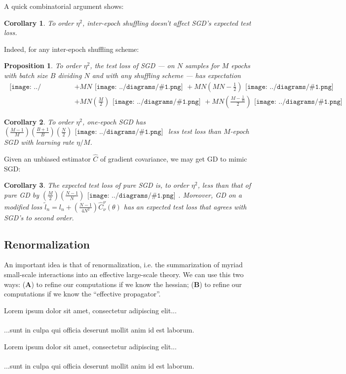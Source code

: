 \documentclass{article}
\newtheorem{cor}{Corollary}
\newtheorem{prop}{Proposition}
\newcommand{\wrap}[1]{\left( #1 \right)}
\newcommand{\dia} [1]{\begin{gathered}\texttt{[image: ../diagrams/\#1.png]}\end{gathered}}
\newcommand{\mdia}[1]{\begin{gathered}\texttt{[image: ../diagrams/\#1.png]}\end{gathered}}
\newcommand{\sdia}[1]{\begin{gathered}\texttt{[image: ../diagrams/\#1.png]}\end{gathered}}
\newcommand{\lorem}[1]{
    Lorem ipsum dolor sit amet, consectetur adipiscing elit...\\
    \nopagebreak\vspace{#1cm} \ \\
    ...sunt in culpa qui officia deserunt mollit anim id est laborum.
}
\begin{document}
    A quick combinatorial argument shows:
    \begin{cor}
        To order $\eta^2$, inter-epoch shuffling doesn't affect SGD's
        expected test loss.
    \end{cor}
    Indeed, for any inter-epoch shuffling scheme: 
    \begin{prop}
        To order $\eta^2$, the test loss of SGD --- on $N$
        samples for $M$ epochs with batch size $B$ dividing $N$ and with any
        shuffling scheme --- has expectation
        {\small
        \begin{align*}
                                                    \dia{(0)()}
            &+ MN                                   \dia{(0-1)(01)}
             + MN\wrap{MN - \frac{1}{2}}            \dia{(0-1-2)(01-12)} \\
            &+ MN\wrap{\frac{M}{2}}                 \dia{c(01-2)(02-12)}  
             + MN\wrap{\frac{M-\frac{1}{B}}{2}}     \dia{c(01-2)(01-12)}
        \end{align*}
        }
    \end{prop}

    \begin{cor}
        To order $\eta^2$, one-epoch SGD has 
        $
             \wrap{\frac{M-1}{M}}\wrap{\frac{B+1}{B}}\wrap{\frac{N}{2}} \mdia{c(01-2)(01-12)}
        $
        less test loss than $M$-epoch SGD with learning rate $\eta/M$. 
    \end{cor}

    Given an unbiased estimator $\hat{C}$ of gradient covariance, we may get
    GD to mimic SGD:
    \begin{cor}
        The expected test loss of pure SGD is, to order $\eta^2$,
        less than that of pure GD by
        $
              \wrap{\frac{M}{2}} \wrap{\frac{N-1}{N}} \sdia{c(01-2)(01-12)}
        $.
        Moreover, GD on a modified loss 
        $
            \tilde l_n = l_n + \wrap{\frac{N-1}{4N^2}} \hat{C}_\nu^\nu(\theta)
        $
        has an expected test loss that agrees with SGD's to second order.
    \end{cor}

\subsection{Renormalization}
    An important idea is that of renormalization, i.e. the summarization of  
    myriad small-scale interactions into an effective large-scale theory. 
    We can use this two ways:
        ({\bf A}) to refine our computations if we know the hessian;  
        ({\bf B}) to refine our computations if we know the ``effective propagator''.
    \lorem{3}
    \lorem{3}
\end{document}
